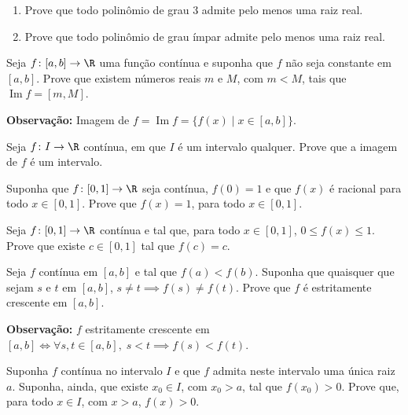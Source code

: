 \begin{exercicio}[7]
\begin{enumerate}[label=\alph*)]
    \item Prove que todo polinômio de grau 3 admite pelo menos uma raiz real.
    \item Prove que todo polinômio de grau ímpar admite pelo menos uma raiz real.
\end{enumerate}
\end{exercicio}

\begin{exercicio}[8]
Seja $f\colon [a, b] \to \R$ uma função contínua e suponha que $f$ não seja constante em $[a, b]$. Prove que existem números reais $m$ e $M$, com $m < M$, tais que $\operatorname{Im} f = [m, M]$.

\smallskip
\noindent\textbf{Observação:} Imagem de $f = \operatorname{Im} f = \{f(x) \mid x \in [a, b]\}$.
\end{exercicio}

\begin{exercicio}[9]
Seja $f\colon I \to \R$ contínua, em que $I$ é um intervalo qualquer. Prove que a imagem de $f$ é um intervalo.
\end{exercicio}

\begin{exercicio}[10]
Suponha que $f\colon [0, 1] \to \R$ seja contínua, $f(0) = 1$ e que $f(x)$ é racional para todo $x \in [0, 1]$. Prove que $f(x) = 1$, para todo $x \in [0, 1]$.
\end{exercicio}

\begin{exercicio}[11]
Seja $f\colon [0, 1] \to \R$ contínua e tal que, para todo $x \in [0, 1]$, $0 \le f(x) \le 1$. Prove que existe $c \in [0, 1]$ tal que $f(c) = c$.
\end{exercicio}

\begin{exercicio}[12]
Seja $f$ contínua em $[a, b]$ e tal que $f(a) < f(b)$. Suponha que quaisquer que sejam $s$ e $t$ em $[a, b]$, $s \neq t \implies f(s) \neq f(t)$. Prove que $f$ é estritamente crescente em $[a, b]$.

\smallskip
\noindent\textbf{Observação:} $f$ estritamente crescente em $[a, b] \iff \forall s, t \in [a, b],\; s < t \implies f(s) < f(t)$.
\end{exercicio}

\begin{exercicio}[13]
Suponha $f$ contínua no intervalo $I$ e que $f$ admita neste intervalo uma única raiz $a$. Suponha, ainda, que existe $x_0 \in I$, com $x_0 > a$, tal que $f(x_0) > 0$. Prove que, para todo $x \in I$, com $x > a$, $f(x) > 0$.
\end{exercicio}


